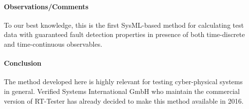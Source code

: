 \paragraph{Observations/Comments}

To our best knowledge, this is the first SysML-based method
for calculating test data with guaranteed fault detection properties in presence of
both time-discrete and time-continuous observables.


\paragraph{Conclusion}

The method developed here is highly relevant for testing cyber-physical systems
in general. Verified Systems International GmbH who maintain the commercial version
of RT-Tester has already decided to make this method available in 2016.